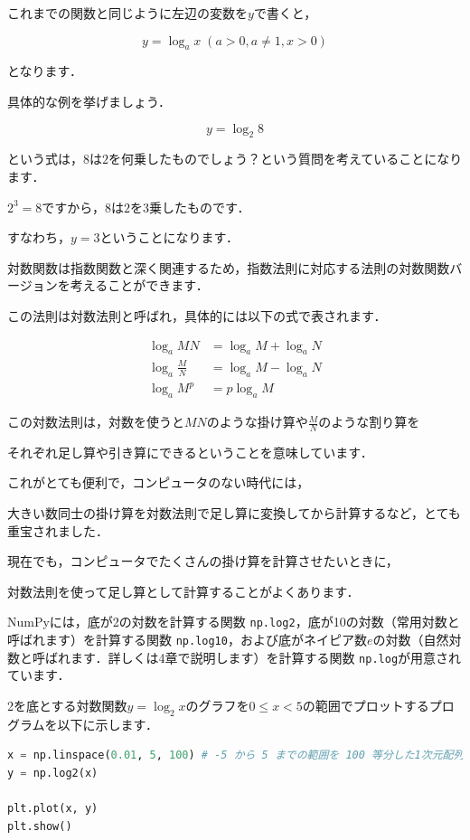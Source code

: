 これまでの関数と同じように左辺の変数を$y$で書くと，

\[
y = \log_a x \; (a > 0, a \neq 1, x > 0)
\]

となります．

具体的な例を挙げましょう．

\[
y = \log_2 8
\]

という式は，$8$は$2$を何乗したものでしょう？という質問を考えていることになります．

$2^3 = 8$ですから，$8$は$2$を$3$乗したものです．

すなわち，$y=3$ということになります．


対数関数は指数関数と深く関連するため，指数法則に対応する法則の対数関数バージョンを考えることができます．

この法則は対数法則と呼ばれ，具体的には以下の式で表されます．

\begin{align}
\log_a MN &= \log_a M + \log_a N \\
\log_a \frac{M}{N} &= \log_a M - \log_a N\\
\log_a M^p &= p \log_a M
\end{align}

この対数法則は，対数を使うと$MN$のような掛け算や$\frac{M}{N}$のような割り算を

それぞれ足し算や引き算にできるということを意味しています．

これがとても便利で，コンピュータのない時代には，

大きい数同士の掛け算を対数法則で足し算に変換してから計算するなど，とても重宝されました．

現在でも，コンピュータでたくさんの掛け算を計算させたいときに，

対数法則を使って足し算として計算することがよくあります．


NumPyには，底が2の対数を計算する関数 \texttt{np.log2}，底が10の対数（常用対数と呼ばれます）を計算する関数 \texttt{np.log10}，および底がネイピア数$e$の対数（自然対数と呼ばれます．詳しくは4章で説明します）を計算する関数 \texttt{np.log}が用意されています．

2を底とする対数関数$y = \log_2 x$のグラフを$0 \le x < 5$の範囲でプロットするプログラムを以下に示します．


\begin{lstlisting}[style=codecell,language=Python]
x = np.linspace(0.01, 5, 100) # -5 から 5 までの範囲を 100 等分した1次元配列
y = np.log2(x)

plt.plot(x, y)
plt.show()
\end{lstlisting}

